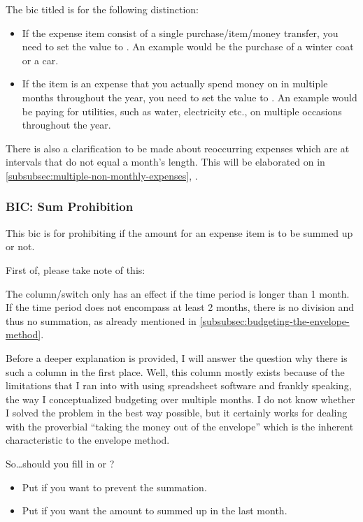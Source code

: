 The \ac{bic} titled  is for the following distinction:
\begin{itemize}
	\item If the expense item consist of a single purchase/item/money transfer, you need to set the value to .
	An example would be the purchase of a winter coat or a car.
	\item If the item is an expense that you actually spend money on in multiple months throughout the year, you need to set the value to .
	An example would be paying for \eg utilities, such as water, electricity etc., on multiple occasions throughout the year.
\end{itemize}

There is also a clarification to be made about reoccurring expenses which are at intervals that do not equal a month's length.
This will be elaborated on in \autoref{subsubsec:multiple-non-monthly-expenses}, .

\subsubsection{BIC: Sum Prohibition}
\label{subsubsec:bic-sum-prohibition}

This \ac{bic} is for prohibiting if the amount for an expense item is to be summed up or not.

First of, please take note of this:
\begin{specialnote}
	The column/switch  only has an effect if the time period is longer than 1 month.
	If the time period does not encompass at least 2 months, there is no division and thus no summation, as already mentioned in \autoref{subsubsec:budgeting-the-envelope-method}.
\end{specialnote}

Before a deeper explanation is provided, I will answer the question why there is such a column in the first place.
Well, this column mostly exists because of the limitations that I ran into with using spreadsheet software and frankly speaking, the way I conceptualized budgeting over multiple months.
I do not know whether I solved the problem in the best way possible, but it certainly works for dealing with the proverbial ``taking the money out of the envelope'' which is the inherent characteristic to the envelope method.

So\ldots should you fill in  or ?
\begin{itemize}
	\item Put  if you want to prevent the summation.
	\item Put  if you want the amount to summed up in the last month.
\end{itemize}

